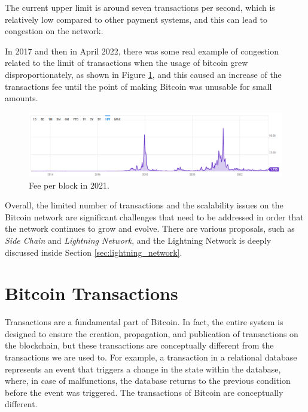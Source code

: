 The current upper limit is around seven transactions per second, 
which is relatively low compared to other payment systems, and 
this can lead to congestion on the network.

In 2017 and then in April 2022, there was some real example of congestion 
related to the limit of transactions when the usage of bitcoin\noteOnBitcoinNaming
grew disproportionately, as shown in Figure \ref{fig:fee_x_block}, and this
caused an increase of the transactions fee until the point of making
Bitcoin was unusable for small amounts.

\begin{figure}
    \begin{center}
      \includegraphics[scale=0.3]{imgs/feerate_blocks.png}
    \end{center}
    \caption{Fee per block in 2021.}
    \label{fig:fee_x_block}
\end{figure}


Overall, the limited number of transactions and the scalability issues on the Bitcoin network
are significant challenges that need to be addressed in order that the network continues
to grow and evolve. There are various proposals, such as \emph{Side Chain} and \emph{Lightning Network}, 
and the Lightning Network is deeply discussed inside Section \ref{sec:lightning_network}.


\section{Bitcoin Transactions}

Transactions are a fundamental part of Bitcoin. In fact, the entire system is designed to ensure
the creation, propagation, and publication of transactions on the blockchain, but these
transactions are conceptually different from the transactions we are used to.
For example, a transaction in a relational database represents an event that triggers a
change in the state within the database, where, in case of malfunctions, the database returns
to the previous condition before the event was triggered.
The transactions of Bitcoin are conceptually different.

